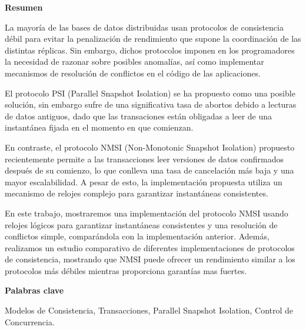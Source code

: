 \newpage

\begin{center}
{\bf \Huge Resumen}
\end{center}

\vspace{1cm}

La mayoría de las bases de datos distribuidas usan protocolos de consistencia débil
para evitar la penalización de rendimiento que supone la coordinación de las distintas
réplicas. Sin embargo, dichos protocolos imponen en los programadores la necesidad de
razonar sobre posibles anomalías, así como implementar mecanismos de resolución de
conflictos en el código de las aplicaciones.

El protocolo PSI (Parallel Snapshot Isolation) se ha propuesto como una posible solución,
sin embargo sufre de una significativa tasa de abortos debido a lecturas de datos antiguos,
dado que las transaciones están obligadas a leer de una instantánea fijada en el momento
en que comienzan.

En contraste, el protocolo NMSI (Non-Monotonic Snapshot Isolation) propuesto recientemente
permite a las transacciones leer versiones de datos confirmados después de su comienzo,
lo que conlleva una tasa de cancelación más baja y una mayor escalabilidad. A pesar de esto,
la implementación propuesta utiliza un mecanismo de relojes complejo para garantizar instantáneas
consistentes.

En este trabajo, mostraremos una implementación del protocolo NMSI usando relojes lógicos
para garantizar instantáneas consistentes y una resolución de conflictos simple, comparándola
con la implementación anterior. Además, realizamos un estudio comparativo de diferentes
implementaciones de protocolos de consistencia, mostrando que NMSI puede ofrecer un rendimiento
similar a los protocolos más débiles mientras proporciona garantías mas fuertes.

\vspace{0.8cm} %

\begin{center}
{\bf \Large Palabras clave}
\end{center}

\vspace{0.5cm}

Modelos de Consistencia, Transacciones, Parallel Snapshot Isolation, Control de Concurrencia.
